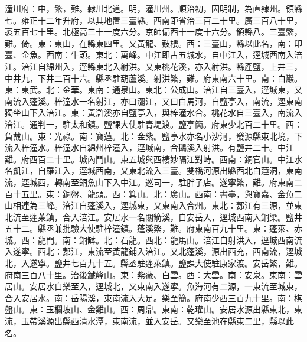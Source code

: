 \begin{pinyinscope}
潼川府：中，繁，難。隸川北道。明，潼川州。順治初，因明制，為直隸州。領縣七。雍正十二年升府，以其地置三臺縣。西南距省治三百二十里。廣三百八十里，袤五百七十里。北極高三十一度六分。京師偏西十一度十六分。領縣八。三臺繁，難。倚。東：東山，在縣東四里。又黃龍、鼓樓。西：三臺山，縣以此名，南：印臺、金魚。西南：牛頭。東北：萬峰。中江即古五城水，自中江入，逕城西南入涪江。涪江自綿州入，逕縣東北入射洪。又東桃花溪，亦入射洪。縣產鹽，上井三，中井九，下井二百十六。縣丞駐葫蘆溪。射洪繁，難。府東南六十里。南：白巖。東：東武。北：金華。東南：通泉山。東北：公成山。涪江自三臺入，逕城東，又南流入蓬溪。梓潼水一名射江，亦曰瀰江，又曰白馬河，自鹽亭入，南流，逕東南獨坐山下入涪江。東：黃滸溪亦自鹽亭入，與梓潼水合。桃花水自三臺入，南流入涪江。通判一，駐太和鎮。鹽課大使駐青堤渡。鹽亭簡。府東少北百二十里。西：負戴山。東：光祿。南：寶蓮。北：金紫。鹽亭水亦名小沙河，發源縣東北境，下流入梓潼水。梓潼水自綿州梓潼入，逕城南，合鵝溪入射洪。有鹽井二十。中江難。府西百二十里。城內鬥山。東五城與西棲妙隔江對峙。西南：銅官山。中江水名凱江，自羅江入，逕城西南，又東北流入三臺。雙橋河源出縣西北白蓮洞，東南流，逕城西，轉南至銅魚山下入中江。巡司一，駐胖子店。遂寧繁，難。府東南二百十五里。東：銅盤、龍頭。西：箕山。北：廣山。西南：書臺，與寶嘉、金魚二山相連為三峰。涪江自蓬溪入，逕城東，又東南入合州。東北：郪江有三源，並東北流至蓬萊鎮，合入涪江。安居水一名關箭溪，自安岳入，逕城西南入銅梁。鹽井五十二。縣丞兼批驗大使駐梓潼鎮。蓬溪繁，難。府東南百九十里。東：蓬萊、赤城。西：龍門。南：銅缽。北：石龍。西北：龍馬山。涪江自射洪入，逕城西南流入遂寧。西北：郪江，東流至黃龍鋪入涪江。又北蓬溪，源出西充，西南流，逕城北，入遂寧。鹽井七百九十五。縣丞駐蓬萊鎮。鹽課大使駐康家渡。安岳繁，難。府南三百八十里。治後鐵峰山。東：紫薇、白雲。西：大雲。南：安泉。東南：雲居山。安居水自樂至入，逕城北，又東南入遂寧。魚海河有二源，一東流至城東，合入安居水。南：岳陽溪，東南流入大足。樂至簡。府南少西三百九十里。南：棋盤山。東：玉欄坡山、金雞山。西：周鼎。東南：乾瓘山。安居水源出縣東北，東流，玉帶溪源出縣西清水潭，東南流，並入安岳。又樂至池在縣東二里，縣以此名。


\end{pinyinscope}
